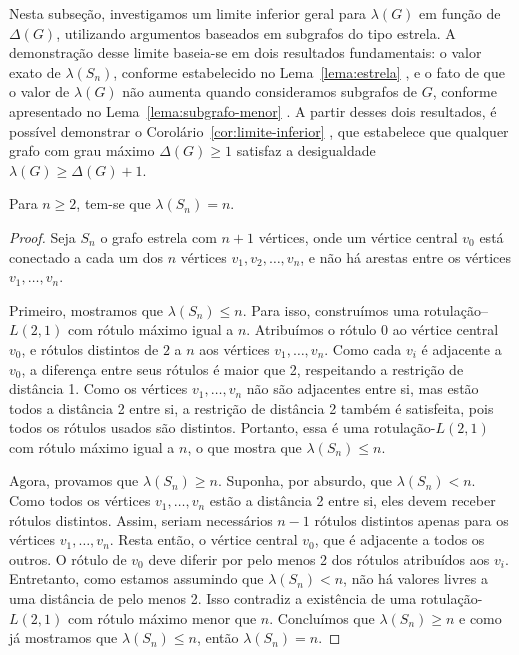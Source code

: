 Nesta subseção, investigamos um limite inferior geral para \(\lambda(G)\) em função de \(\Delta(G)\), utilizando argumentos baseados em subgrafos do tipo estrela. A demonstração desse limite baseia-se em dois resultados fundamentais: o valor exato de \(\lambda(S_n)\), conforme estabelecido no Lema~\ref{lema:estrela} \cite{griggs1992labelling}, e o fato de que o valor de \(\lambda(G)\) não aumenta quando consideramos subgrafos de \(G\), conforme apresentado no Lema~\ref{lema:subgrafo-menor} \cite{posner20092}. A partir desses dois resultados, é possível demonstrar o Corolário~\ref{cor:limite-inferior} \cite{griggs1992labelling}, que estabelece que qualquer grafo com grau máximo \(\Delta(G) \geq 1\) satisfaz a desigualdade \(\lambda(G) \geq \Delta(G) + 1\).

\begin{lema}
\label{lema:estrela}
Para \(n \geq 2\), tem-se que \( \lambda(S_n) = n \).
\end{lema}
\begin{proof}
    Seja \( S_n \) o grafo estrela com \( n+1 \) vértices, onde um vértice central \( v_0 \) está conectado a cada um dos \( n \) vértices \( v_1, v_2, \dots, v_n \), e não há arestas entre os vértices \( v_1, \dots, v_n \).

    Primeiro, mostramos que \( \lambda(S_n) \leq n \). Para isso, construímos uma rotulação–\(L(2,1)\) com rótulo máximo igual a \( n \). Atribuímos o rótulo \( 0 \) ao vértice central \( v_0 \), e rótulos distintos de \( 2 \) a \( n \) aos vértices \( v_1, \dots, v_n \). Como cada \( v_i \) é adjacente a \( v_0 \), a diferença entre seus rótulos é maior que 2, respeitando a restrição de distância 1. Como os vértices \( v_1, \dots, v_n \) não são adjacentes entre si, mas estão todos a distância 2 entre si, a restrição de distância 2 também é satisfeita, pois todos os rótulos usados são distintos. Portanto, essa é uma rotulação-\(L(2,1)\) com rótulo máximo igual a \( n \), o que mostra que \( \lambda(S_n) \leq n \).

    Agora, provamos que \( \lambda(S_n) \geq n \). Suponha, por absurdo, que \( \lambda(S_n) < n \). Como todos os vértices \( v_1, \dots, v_n \) estão a distância 2 entre si, eles devem receber rótulos distintos. Assim, seriam necessários \( n - 1 \) rótulos distintos apenas para os vértices \( v_1, \dots, v_n \). Resta então, o vértice central \( v_0 \), que é adjacente a todos os outros. O rótulo de \( v_0 \) deve diferir por pelo menos 2 dos rótulos atribuídos aos \( v_i \). Entretanto, como estamos assumindo que \( \lambda(S_n) < n \), não há valores livres a uma distância de pelo menos 2. Isso contradiz a existência de uma rotulação-\(L(2,1)\) com rótulo máximo menor que \( n \). Concluímos que \( \lambda(S_n) \geq n \) e como já mostramos que \( \lambda(S_n) \leq n \), então \( \lambda(S_n) = n \).
\end{proof}


